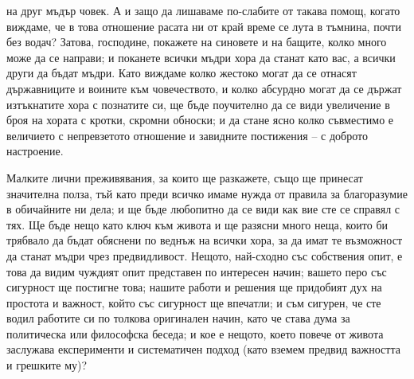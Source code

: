 \documentclass[12pt]{book}
\begin{document}
на друг мъдър човек. А и защо да лишаваме по-слабите от такава помощ, когато виждаме, че в това отношение расата ни от край време се лута в тъмнина, почти без водач? Затова, господине, покажете на синовете и на бащите, колко много може да се направи; и поканете всички мъдри хора да станат като вас, а всички други да бъдат мъдри. Като виждаме колко жестоко могат да се отнасят държавниците и воините към човечеството, и колко абсурдно могат да се държат изтъкнатите хора с познатите си, ще бъде поучително да се види увеличение в броя на хората с кротки, скромни обноски; и да стане ясно колко съвместимо е величието с непревзетото отношение и завидните постижения – с доброто настроение.

Малките лични преживявания, за които ще разкажете, също ще принесат значителна полза, тъй като преди всичко имаме нужда от правила за благоразумие в обичайните ни дела; и ще бъде любопитно да се види как вие сте се справял с тях. Ще бъде нещо като ключ към живота и ще разясни много неща, които би трябвало да бъдат обяснени по веднъж на всички хора, за да имат те възможност да станат мъдри чрез предвидливост. Нещото, най-сходно със собствения опит, е това да видим чуждият опит представен по интересен начин; вашето перо със сигурност ще постигне това; нашите работи и решения ще придобият дух на простота и важност, който със сигурност ще впечатли; и съм сигурен, че сте водил работите си по толкова оригинален начин, като че става дума за политическа или философска беседа; и кое е нещото, което повече от живота заслужава експерименти и систематичен подход (като вземем предвид важността и грешките му)?
\end{document}
